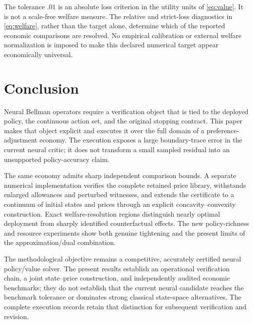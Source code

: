 The tolerance $.01$ is an absolute loss criterion in the utility units of \eqref{eq:value}. It is not a scale-free welfare measure. The relative and strict-loss diagnostics in \eqref{eq:welfare}, rather than the target alone, determine which of the reported economic comparisons are resolved. No empirical calibration or external welfare normalization is imposed to make this declared numerical target appear economically universal.

\section{Conclusion}\label{sec:conclusion}
Neural Bellman operators require a verification object that is tied to the deployed policy, the continuous action set, and the original stopping contract. This paper makes that object explicit and executes it over the full domain of a preference-adjustment economy. The execution exposes a large boundary-trace error in the current neural critic; it does not transform a small sampled residual into an unsupported policy-accuracy claim.

The same economy admits sharp independent comparison bounds. A separate numerical implementation verifies the complete retained price library, withstands enlarged allowances and perturbed witnesses, and extends the certificate to a continuum of initial states and prices through an explicit concavity--convexity construction. Exact welfare-resolution regions distinguish nearly optimal deployment from sharply identified counterfactual effects. The new policy-richness and resource experiments show both genuine tightening and the present limits of the approximation/dual combination.

The methodological objective remains a competitive, accurately certified neural policy/value solver. The present results establish an operational verification chain, a joint state--price construction, and independently audited economic benchmarks; they do not establish that the current neural candidate reaches the benchmark tolerance or dominates strong classical state-space alternatives. The complete execution records retain that distinction for subsequent verification and revision.
